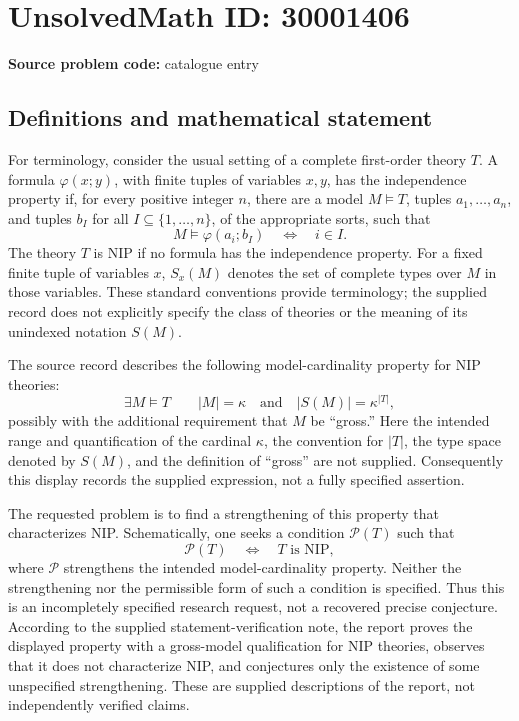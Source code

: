 \documentclass[11pt]{article}
\begin{document}
\section*{UnsolvedMath ID: 30001406}
\textbf{Source problem code:} catalogue entry
\subsection{Definitions and mathematical statement}
For terminology, consider the usual setting of a complete first-order theory \(T\). A formula \(\varphi(x;y)\), with finite tuples of variables \(x,y\), has the independence property if, for every positive integer \(n\), there are a model \(M\models T\), tuples \(a_1,\ldots,a_n\), and tuples \(b_I\) for all \(I\subseteq\{1,\ldots,n\}\), of the appropriate sorts, such that
\[
M\models\varphi(a_i;b_I)\quad\Longleftrightarrow\quad i\in I.
\]
The theory \(T\) is NIP if no formula has the independence property. For a fixed finite tuple of variables \(x\), \(S_x(M)\) denotes the set of complete types over \(M\) in those variables. These standard conventions provide terminology; the supplied record does not explicitly specify the class of theories or the meaning of its unindexed notation \(S(M)\).

The source record describes the following model-cardinality property for NIP theories:
\[
\exists M\models T\qquad |M|=\kappa\quad\text{and}\quad |S(M)|=\kappa^{|T|},
\]
possibly with the additional requirement that \(M\) be ``gross.'' Here the intended range and quantification of the cardinal \(\kappa\), the convention for \(|T|\), the type space denoted by \(S(M)\), and the definition of ``gross'' are not supplied. Consequently this display records the supplied expression, not a fully specified assertion.

The requested problem is to find a strengthening of this property that characterizes NIP. Schematically, one seeks a condition \(\mathcal P(T)\) such that
\[
\mathcal P(T)\quad\Longleftrightarrow\quad T\text{ is NIP},
\]
where \(\mathcal P\) strengthens the intended model-cardinality property. Neither the strengthening nor the permissible form of such a condition is specified. Thus this is an incompletely specified research request, not a recovered precise conjecture. According to the supplied statement-verification note, the report proves the displayed property with a gross-model qualification for NIP theories, observes that it does not characterize NIP, and conjectures only the existence of some unspecified strengthening. These are supplied descriptions of the report, not independently verified claims.
\end{document}
